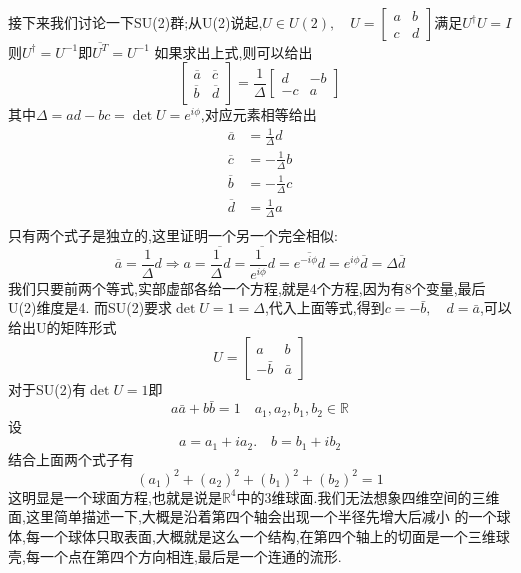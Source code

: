 \documentclass[../main.tex]{subfiles}
\begin{document}
 接下来我们讨论一下SU(2)群;从U(2)说起,$U \in U(2),\quad U = \begin{bmatrix}
     a&b\\
     c&d
 \end{bmatrix}$满足$U^\dagger U = I$则$U^\dagger = U^{-1}$即$\overline{U^T} = U^{-1}$
 如果求出上式,则可以给出$$\begin{bmatrix}
     \overline{a}&\overline{c}\\
     \overline{b}&\overline{d}
 \end{bmatrix}=\frac{1}{\Delta}\begin{bmatrix}
     d&-b\\
     -c&a
 \end{bmatrix}$$其中$\Delta = ad - bc = \det U = e^{i\phi}$,对应元素相等给出\begin{align*}
     \overline{a}&= \frac{1}{\Delta}d  \\      
     \overline{c}&= -\frac{1}{\Delta}b\\
     \overline{b}&= -\frac{1}{\Delta}c\\
     \overline{d}&= \frac{1}{\Delta}a\\
 \end{align*}
 只有两个式子是独立的,这里证明一个另一个完全相似:
 $$\overline{a} = \frac{1}{\Delta}d \Longrightarrow a = \overline{\frac{1}{\Delta}{d}} = \overline{\frac{1}{e^{i\phi}}d} = \overline{e^{-i\phi}d} = e^{i\phi}\overline{d} =\Delta \overline{d}$$
 我们只要前两个等式,实部虚部各给一个方程,就是4个方程,因为有8个变量,最后U(2)维度是4.
 而SU(2)要求$\det U = 1 = \Delta$,代入上面等式,得到$c=-\bar{b},\quad d= \bar{a}$,可以给出U的矩阵形式$$U = \begin{bmatrix}
     a&b\\
     -\bar{b}&\bar{a}
 \end{bmatrix}$$
 对于SU(2)有$\det U = 1$即 $$a\bar{a} + b \bar{b} = 1\quad a_1,a_2,b_1,b_2 \in \mathbb{R}$$
 设$$a = a_1 +i a_2.\quad b = b_1 + ib_2$$
 结合上面两个式子有$$(a_1)^2 + (a_2)^2 +(b_1)^2 + (b_2)^2 = 1$$这明显是一个球面方程,也就是说是$\mathbb{R}^4$中的3维球面.我们无法想象四维空间的三维面,这里简单描述一下,大概是沿着第四个轴会出现一个半径先增大后减小
 的一个球体,每一个球体只取表面,大概就是这么一个结构,在第四个轴上的切面是一个三维球壳,每一个点在第四个方向相连,最后是一个连通的流形.
\end{document}
